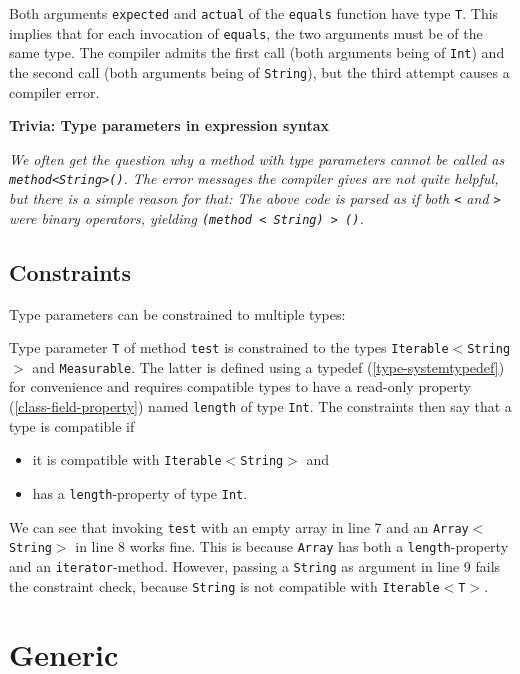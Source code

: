 \documentclass[a4paper,oneside]{book}
\newcommand{\type}[1]{\texttt{#1}}
\newcommand{\expr}[1]{\texttt{#1}}
\newenvironment{myshaded}
  {\def\FrameCommand{\fboxsep=\topsep\colorbox{bgcolor}}%
  \MakeFramed {\advance\hsize-\width \FrameRestore}}%
 {\endMakeFramed}
\newcommand{\trivia}[2]
	{\begin{myshaded}\noindent\textbf{Trivia: #1}\par\nobreak\noindent\ignorespaces\textit{#2}\end{myshaded}}
\newcommand{\tref}[2]{#1 (\ref{#2})}
\newcommand{\haxe}[2][]{%
}
\begin{document}
\haxe{assets/FunctionTypeParameter.hx}

Both arguments \expr{expected} and \expr{actual} of the \expr{equals} function have type \type{T}. This implies that for each invocation of \expr{equals}, the two arguments must be of the same type. The compiler admits the first call (both arguments being of \type{Int}) and the second call (both arguments being of \type{String}), but the third attempt causes a compiler error.

\trivia{Type parameters in expression syntax}{We often get the question why a method with type parameters cannot be called as \expr{method<String>()}. The error messages the compiler gives are not quite helpful, but there is a simple reason for that: The above code is parsed as if both \expr{<} and \expr{>} were binary operators, yielding \expr{(method < String) > ()}.}

\subsection{Constraints}
\label{type-systemtype-parameter-constraints}

Type parameters can be constrained to multiple types:

\haxe{assets/Constraints.hx}
Type parameter \type{T} of method \expr{test} is constrained to the types \type{Iterable$<$String$>$} and \type{Measurable}. The latter is defined using a \tref{typedef}{type-systemtypedef} for convenience and requires compatible types to have a read-only \tref{property}{class-field-property} named \expr{length} of type \type{Int}. The constraints then say that a type is compatible if

\begin{itemize}
	\item it is compatible with \type{Iterable$<$String$>$} and
	\item has a \expr{length}-property of type \type{Int}.
\end{itemize}
We can see that invoking \expr{test} with an empty array in line 7 and an \type{Array$<$String$>$} in line 8 works fine. This is because \type{Array} has both a \expr{length}-property and an \expr{iterator}-method. However, passing a \type{String} as argument in line 9 fails the constraint check, because \type{String} is not compatible with \type{Iterable$<$T$>$}. 


\section{Generic}
\label{type-systemgeneric}
\end{document}
